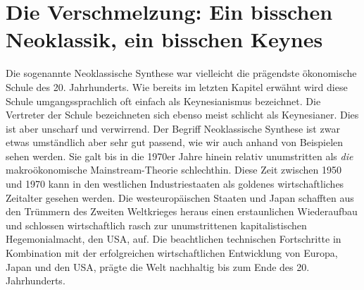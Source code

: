 %
%
%

\chapter{Die Verschmelzung: Ein bisschen Neoklassik, ein bisschen Keynes}
\label{Synthese}

Die sogenannte Neoklassische Synthese war vielleicht die prägendste ökonomische Schule des 20. Jahrhunderts. Wie bereits im letzten Kapitel erwähnt wird diese Schule umgangssprachlich oft einfach als Keynesianismus bezeichnet. Die Vertreter der Schule bezeichneten sich ebenso meist schlicht als Keynesianer. Dies ist aber unscharf und verwirrend. Der Begriff Neoklassische Synthese ist zwar etwas umständlich aber sehr gut passend, wie wir auch anhand von Beispielen sehen werden. Sie galt bis in die 1970er Jahre hinein relativ unumstritten als \textit{die} makroökonomische Mainstream-Theorie schlechthin. Diese Zeit zwischen 1950 und 1970 kann in den westlichen Industriestaaten als goldenes wirtschaftliches Zeitalter gesehen werden. Die westeuropäischen Staaten und Japan schafften aus den Trümmern des Zweiten Weltkrieges heraus einen erstaunlichen Wiederaufbau und schlossen wirtschaftlich rasch zur unumstrittenen kapitalistischen Hegemonialmacht, den USA, auf. Die beachtlichen technischen Fortschritte in Kombination mit der erfolgreichen wirtschaftlichen Entwicklung von Europa, Japan und den USA, prägte die Welt nachhaltig bis zum Ende des 20. Jahrhunderts.

